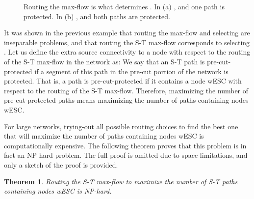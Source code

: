 \documentclass[conference]{IEEEtran}
\newtheorem{theorem}{Theorem}
\begin{document}
\begin{figure}[htp]
\begin{center}
\hspace{1cm}
\end{center}
\caption{Routing the max-flow is what determines . In (a) , and one path is protected. In (b) , and both paths are protected.}
\label{fig:ex1}
\end{figure}

It was shown in the previous example that routing the max-flow and selecting  are inseparable problems, and that routing the S-T max-flow corresponds to selecting . Let us define the extra source connectivity to a node  with respect to the routing of the S-T max-flow in the network as: We say that an S-T path is pre-cut-protected if a segment of this path in the pre-cut portion of the network is protected. That is, a path is pre-cut-protected if it contains a node wESC with respect to the routing of the S-T max-flow. Therefore, maximizing the number of pre-cut-protected paths means maximizing the number of paths containing nodes wESC. 

For large networks, trying-out all possible routing choices to find the best one that will maximize the number of paths containing nodes wESC is computationally expensive. The following theorem proves that this problem is in fact an NP-hard problem. The full-proof is omitted due to space limitations, and only a sketch of the proof is provided.

\begin{theorem}
Routing the S-T max-flow to maximize the number of S-T paths containing nodes wESC is NP-hard.
\end{theorem}
\end{document}
